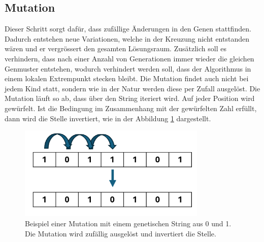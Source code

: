 %
%
%
%
\subsection{Mutation
\label{buch:paper:varalg:subsection:mutation}}
Dieser Schritt sorgt dafür, dass zufällige Änderungen in 
den Genen stattfinden. Dadurch entstehen neue Variationen, welche
in der Kreuzung nicht entstanden wären und er vergrössert den 
gesamten Lösungsraum. Zusätzlich soll es verhindern,
dass nach einer Anzahl von Generationen immer wieder die
gleichen Genmuster entstehen, wodurch verhindert werden soll, dass 
der Algorithmus in einem lokalen Extrempunkt stecken bleibt. 
Die Mutation findet auch nicht bei jedem Kind
statt, sondern wie in der Natur werden diese per Zufall
ausgelöst. Die Mutation läuft so ab, dass über den String
iteriert wird. Auf jeder Position wird gewürfelt. Ist 
die Bedingung im Zusammenhang mit der gewürfelten Zahl erfüllt, dann wird 
die Stelle invertiert, wie in der
Abbildung \ref{fig:mutation_genetic_string} dargestellt.
\begin{figure}
	\centering
	\includegraphics[width=0.8\textwidth]{
        papers/varalg/images/teil3/09GeneticStringMutation.png
        }
	\caption{
	Beispiel einer Mutation mit einem genetischen String aus 0 und 1. Die
	Mutation wird zufällig ausgelöst und invertiert die Stelle.
	}
	\label{fig:mutation_genetic_string}
\end{figure}

